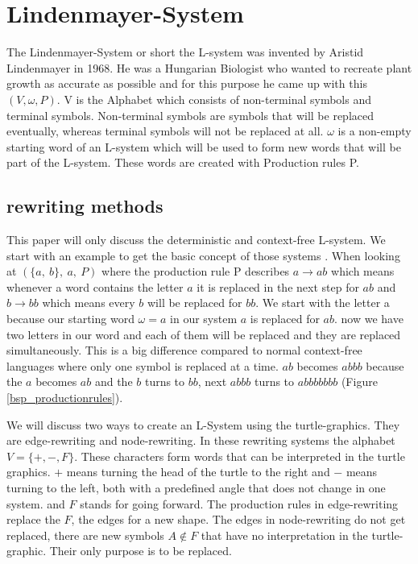 \documentclass[a4paper, 11pt]{article}
\begin{document}
\section{Lindenmayer-System}
    The Lindenmayer-System or short the L-system was invented by Aristid Lindenmayer in 1968. He was a Hungarian Biologist who wanted to recreate plant growth as accurate as possible and for this purpose he came up with this $(V, \omega, P)$. V is the Alphabet which consists of non-terminal symbols and terminal symbols. Non-terminal symbols are symbols that will be replaced eventually, whereas terminal symbols will not be replaced at all. $\omega$ is a non-empty starting word of an L-system which will be used to form new words that will be part of the L-system. These words are created with Production rules P.
\subsection{rewriting methods}
This paper will only discuss the deterministic and context-free L-system. We start with an example to get the basic concept of those systems . When looking at $(\{a,\ b\},\ a,\ P)$ where the production rule P describes $a \rightarrow ab$ which means whenever a word contains the letter $a$ it is replaced in the next step for $ab$ and $b \rightarrow bb$ which means every $b$ will be replaced for $bb$. We start with the letter a because our starting word $\omega =a$ in our system $a$ is replaced for $ab$. now we have two letters in our word and each of them will be replaced and they are replaced simultaneously. This is a big difference compared to normal context-free languages where only one symbol is replaced at a time. $ab$ becomes $abbb$ because the $a$ becomes $ab$ and the $b$ turns to $bb$, next $abbb$ turns to $abbbbbbb$ (Figure \ref{bsp_productionrules}). 

We will discuss two ways to create an L-System using the turtle-graphics. They are edge-rewriting and node-rewriting. In these rewriting systems the alphabet $V=\{+,-,F\}$. These characters form words that can be interpreted in the turtle graphics. $+$ means turning the head of the turtle to the right and $-$ means turning to the left, both with a predefined angle that does not change in one system. and $F$ stands for going forward.
The production rules in edge-rewriting replace the $F$, the edges for a new shape. The edges in node-rewriting do not get replaced, there are new symbols $A\notin F$ that have no interpretation in the turtle-graphic. Their only purpose is to be replaced.
\end{document}
